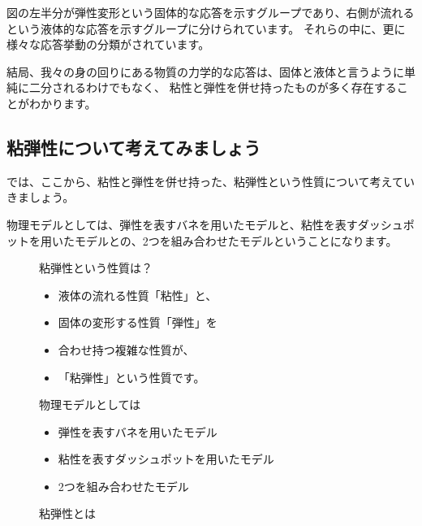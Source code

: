 \documentclass[uplatex,dvipdfmx,a4paper,11pt]{jsarticle}
\begin{document}
図の左半分が弾性変形という固体的な応答を示すグループであり、右側が流れるという液体的な応答を示すグループに分けられています。
それらの中に、更に様々な応答挙動の分類がされています。

結局、我々の身の回りにある物質の力学的な応答は、固体と液体と言うように単純に二分されるわけでもなく、
粘性と弾性を併せ持ったものが多く存在することがわかります。

\subsection{粘弾性について考えてみましょう}

では、ここから、粘性と弾性を併せ持った、粘弾性という性質について考えていきましょう。

物理モデルとしては、弾性を表すバネを用いたモデルと、粘性を表すダッシュポットを用いたモデルとの、2つを組み合わせたモデルということになります。

\begin{figure}[htb]
	\begin{center}
		\begin{minipage}{0.4\textwidth}
			\begin{itembox}[l]{粘弾性という性質は？}
				\begin{itemize}
					\item 液体の流れる性質「粘性」と、
					\item 固体の変形する性質「弾性」を
					\item 合わせ持つ複雑な性質が、
					\item 「粘弾性」という性質です。
				\end{itemize}
			\end{itembox}
		\end{minipage}
		\begin{minipage}{0.45\textwidth}
			\begin{itembox}[l]{物理モデルとしては}
				\begin{itemize}
					\item 弾性を表すバネを用いたモデル
					\item 粘性を表すダッシュポットを用いたモデル
					\item 2つを組み合わせたモデル
				\end{itemize}
			\end{itembox}
		\end{minipage}
		\caption{粘弾性とは}
	\end{center}
\end{figure}
\end{document}
